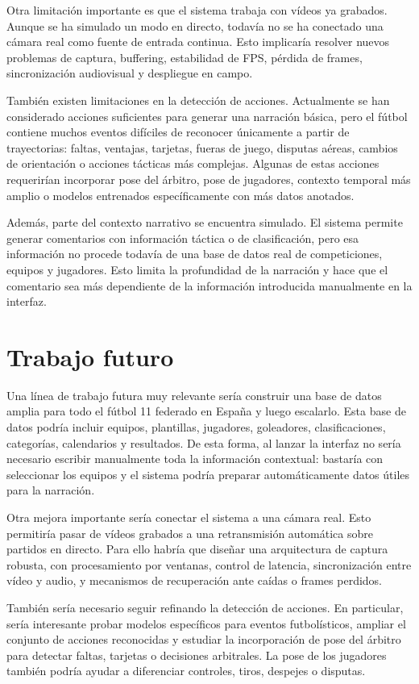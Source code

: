 Otra limitación importante es que el sistema trabaja con vídeos ya grabados. Aunque se ha simulado un modo en directo, todavía no se ha conectado una cámara real como fuente de entrada continua. Esto implicaría resolver nuevos problemas de captura, buffering, estabilidad de FPS, pérdida de frames, sincronización audiovisual y despliegue en campo.

También existen limitaciones en la detección de acciones. Actualmente se han considerado acciones suficientes para generar una narración básica, pero el fútbol contiene muchos eventos difíciles de reconocer únicamente a partir de trayectorias: faltas, ventajas, tarjetas, fueras de juego, disputas aéreas, cambios de orientación o acciones tácticas más complejas. Algunas de estas acciones requerirían incorporar pose del árbitro, pose de jugadores, contexto temporal más amplio o modelos entrenados específicamente con más datos anotados.

Además, parte del contexto narrativo se encuentra simulado. El sistema permite generar comentarios con información táctica o de clasificación, pero esa información no procede todavía de una base de datos real de competiciones, equipos y jugadores. Esto limita la profundidad de la narración y hace que el comentario sea más dependiente de la información introducida manualmente en la interfaz.

\section{Trabajo futuro}

Una línea de trabajo futura muy relevante sería construir una base de datos amplia para todo el fútbol 11 federado en España y luego escalarlo. Esta base de datos podría incluir equipos, plantillas, jugadores, goleadores, clasificaciones, categorías, calendarios y resultados. De esta forma, al lanzar la interfaz no sería necesario escribir manualmente toda la información contextual: bastaría con seleccionar los equipos y el sistema podría preparar automáticamente datos útiles para la narración.

Otra mejora importante sería conectar el sistema a una cámara real. Esto permitiría pasar de vídeos grabados a una retransmisión automática sobre partidos en directo. Para ello habría que diseñar una arquitectura de captura robusta, con procesamiento por ventanas, control de latencia, sincronización entre vídeo y audio, y mecanismos de recuperación ante caídas o frames perdidos.

También sería necesario seguir refinando la detección de acciones. En particular, sería interesante probar modelos específicos para eventos futbolísticos, ampliar el conjunto de acciones reconocidas y estudiar la incorporación de pose del árbitro para detectar faltas, tarjetas o decisiones arbitrales. La pose de los jugadores también podría ayudar a diferenciar controles, tiros, despejes o disputas.

